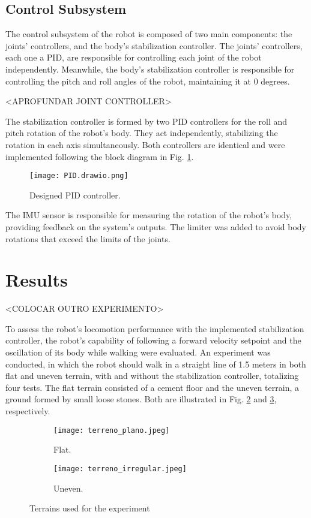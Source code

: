 \documentclass[conference]{IEEEtran}
\begin{document}
\subsection{Control Subsystem}

The control subsystem of the robot is composed of two main components: the joints' controllers, and the body's stabilization controller. The joints' controllers, each one a PID, are responsible for controlling each joint of the robot independently. Meanwhile, the body's stabilization controller is responsible for controlling the pitch and roll angles of the robot, maintaining it at 0 degrees.  

<APROFUNDAR JOINT CONTROLLER>

The stabilization controller is formed by two PID controllers for the roll and pitch rotation of the robot's body. They act independently, stabilizing the rotation in each axis simultaneously. Both controllers are identical and were implemented following the block diagram in Fig. \ref{fig:pid}.

\begin{figure}[htbp]
  \centering
  \texttt{[image: PID.drawio.png]}
  \caption{Designed PID controller.}
  \label{fig:pid}
\end{figure}

The IMU sensor is responsible for measuring the rotation of the robot's body, providing feedback on the system's outputs. The limiter was added to avoid body rotations that exceed the limits of the joints.

\section{Results}

<COLOCAR OUTRO EXPERIMENTO>

To assess the robot's locomotion performance with the implemented stabilization controller, the robot's capability of following a forward velocity setpoint and the oscillation of its body while walking were evaluated. An experiment was conducted, in which the robot should walk in a straight line of 1.5 meters in both flat and uneven terrain, with and without the stabilization controller, totalizing four tests. The flat terrain consisted of a cement floor and the uneven terrain, a ground formed by small loose stones. Both are illustrated in Fig. \ref{fig:terreno_plano} and \ref{fig:terreno_uneven}, respectively.

\begin{figure}[htbp]
  \centering
  \begin{subfigure}[htbp]{0.24\textwidth}
    \centering
    \texttt{[image: terreno\_plano.jpeg]}
    \caption{Flat.}
    \label{fig:terreno_plano}
  \end{subfigure}
  \begin{subfigure}[htbp]{0.24\textwidth}
    \centering
    \texttt{[image: terreno\_irregular.jpeg]}
    \caption{Uneven.}
    \label{fig:terreno_uneven}
  \end{subfigure}
  \vfill
  \caption{Terrains used for the experiment}
  \label{fig:terrenos}
\end{figure}
\end{document}
